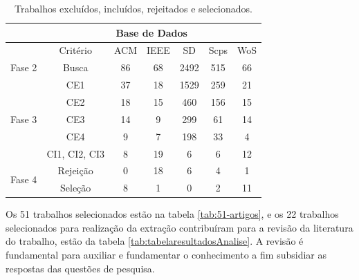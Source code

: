 \begin{longtable}{c|c|c|c|c|c|c|}
\caption{Trabalhos excluídos, incluídos, rejeitados e selecionados.}
\label{tab:fase-revisao-literatura}\\
\cline{2-7}
 & \multicolumn{6}{c|}{Base de Dados} \\ \cline{2-7} 
\endfirsthead
%
\endhead
%
 & Critério & \acrshort{ACM} & \acrlong{IEEE} & \acrlong{SD} & \acrlong{Scps} & \acrlong{WoS} \\ \hline
\multicolumn{1}{|c|}{Fase 2} & Busca & 86 & 68 & 2492 & 515 & 66 \\ \hline
\multicolumn{1}{|c|}{\multirow{5}{*}{Fase 3}} & CE1 & 37 & 18 & 1529 & 259 & 21 \\ \cline{2-7} 
\multicolumn{1}{|c|}{} & CE2 & 18 & 15 & 460 & 156 & 15 \\ \cline{2-7} 
\multicolumn{1}{|c|}{} & CE3 & 14 & 9 & 299 & 61 & 14 \\ \cline{2-7} 
\multicolumn{1}{|c|}{} & CE4 & 9 & 7 & 198 & 33 & 4 \\ \cline{2-7} 
\multicolumn{1}{|c|}{} & CI1, CI2, CI3 & 8 & 19 & 6 & 6 & 12 \\ \hline
\multicolumn{1}{|c|}{\multirow{2}{*}{Fase 4}} & Rejeição & 0 & 18 & 6 & 4 & 1 \\ \cline{2-7} 
\multicolumn{1}{|c|}{} & Seleção & 8 & 1 & 0 & 2 & 11 \\ \hline
\end{longtable}

Os 51 trabalhos selecionados estão na tabela \ref{tab:51-artigos}, e os 22 trabalhos selecionados para  realização da extração contribuíram para a revisão da literatura do trabalho, estão da tabela \ref{tab:tabelaresultadosAnalise}. A revisão é fundamental para auxiliar e fundamentar o conhecimento a fim subsidiar as respostas das questões de pesquisa. 

